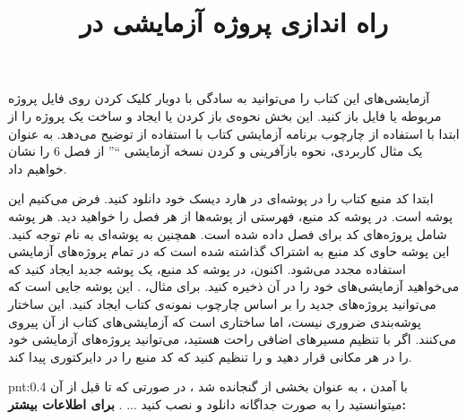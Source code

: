 
\title{
    \huge
    \hspace{-40pt}
    \textbf{راه اندازی پروژه آزمایشی در }
}  \rullFillWithLine[0.5em]{1pt}
\textbf{\vspace{7pt}}

{
    \Large
    \begin{spacing}{1.5}
        آزمایشی‌های این کتاب را می‌توانید به سادگی با دوبار کلیک کردن روی فایل پروژه مربوطه  یا فایل  باز کنید.
        این بخش نحوه‌ی باز کردن یا ایجاد و ساخت یک پروژه را از ابتدا با استفاده از چارچوب برنامه آزمایشی کتاب با استفاده از  توضیح می‌دهد.
        به عنوان یک مثال کاربردی، نحوه بازآفرینی و  کردن نسخه آزمایشی \enquote{} از فصل 6 را نشان خواهیم داد.
    \end{spacing}
}

\textbf{\vspace{-30pt}}
\title{
    \LARGE
}
\textbf{\vspace{-10pt}}

{
    \Large
    \begin{spacing}{1.5}
        ابتدا کد منبع کتاب را در پوشه‌ای در هارد دیسک خود دانلود کنید.
        فرض می‌کنیم این پوشه  است.
        در پوشه کد منبع، فهرستی از پوشه‌ها از هر فصل را خواهید دید. هر پوشه شامل پروژه‌های کد برای فصل داده شده است.
        همچنین به پوشه‌ای به نام  توجه کنید. این پوشه حاوی کد منبع به اشتراک گذاشته شده است که در تمام پروژه‌های آزمایشی استفاده مجدد می‌شود.
        اکنون، در پوشه کد منبع، یک پوشه جدید ایجاد کنید که می‌خواهید آزمایشی‌های خود را در آن ذخیره کنید.
        برای مثال، . این پوشه جایی است که می‌توانید پروژه‌های جدید را بر اساس چارچوب نمونه‌ی کتاب ایجاد کنید.
        این ساختار پوشه‌بندی ضروری نیست، اما ساختاری است که آزمایشی‌های کتاب از آن پیروی می‌کنند. اگر با تنظیم مسیر‌های اضافی راحت هستید، می‌توانید پروژه‌های آزمایشی خود را در هر مکانی قرار دهید و  را تنظیم کنید که کد منبع را در دایرکتوری  پیدا کند.

        \begin{point}{pnt:0.4}
            با آمدن ،  به عنوان بخشی از  گنجانده شد ، در صورتی که تا قبل از آن میتوانستید  را به صورت جداگانه دانلود و نصب کنید ... .
            \textbf{برای اطلاعات بیشتر:} \href{https://learn.microsoft.com/en-us/windows/win32/directx-sdk--august-2009-}{}
        \end{point}
    \end{spacing}
}

